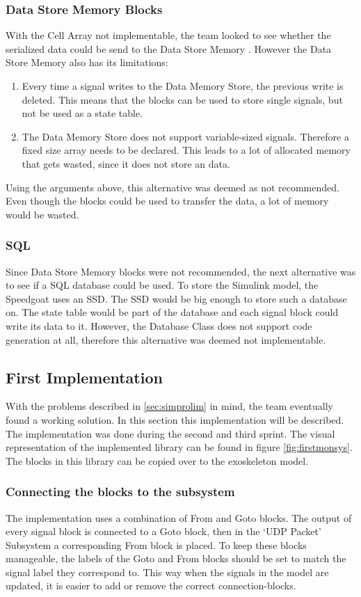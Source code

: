 \subsubsection{Data Store Memory Blocks}
With the Cell Array not implementable, the team looked to see whether the serialized data could be send to the Data Store Memory \cite{web:datastore}. However the Data Store Memory also has its limitations:
\begin{enumerate}
	\item Every time a signal writes to the Data Memory Store, the previous write is deleted. This means that the blocks can be used to store single signals, but not be used as a state table.
	\item The Data Memory Store does not support variable-sized signals. Therefore a fixed size array needs to be declared. This leads to a lot of allocated memory that gets wasted, since it does not store an data.
\end{enumerate}
Using the arguments above, this alternative was deemed as not recommended. Even though the blocks could be used to transfer the data, a lot of memory would be wasted.

\subsubsection{SQL}
Since Data Store Memory blocks were not recommended, the next alternative was to see if a SQL database could be used. To store the Simulink model, the Speedgoat uses an SSD. The SSD would be big enough to store such a database on. The state table would be part of the database and each signal block could write its data to it. However, the Database Class does not support code generation at all, therefore this alternative was deemed not implementable.

\subsection{First Implementation}\label{sec:simfirim}
With the problems described in \ref{sec:simprolim} in mind, the team eventually found a working solution. In this section this implementation will be described. The implementation was done during the second and third sprint. The visual representation of the implemented library can be found in figure \ref{fig:firstmonsys}. The blocks in this library can be copied over to the exoskeleton model.

\subsubsection{Connecting the blocks to the subsystem}
The implementation uses a combination of From \cite{web:from} and Goto \cite{web:goto} blocks. The output of every signal block is connected to a Goto block, then in the `UDP Packet' Subsystem a corresponding From block is placed. To keep these blocks manageable, the labels of the Goto and From blocks should be set to match the signal label they correspond to. This way when the signals in the model are updated, it is easier to add or remove the correct connection-blocks.


